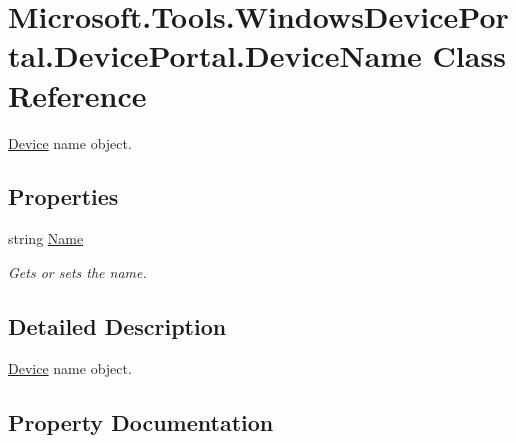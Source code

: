 \hypertarget{class_microsoft_1_1_tools_1_1_windows_device_portal_1_1_device_portal_1_1_device_name}{}\section{Microsoft.\+Tools.\+Windows\+Device\+Portal.\+Device\+Portal.\+Device\+Name Class Reference}
\label{class_microsoft_1_1_tools_1_1_windows_device_portal_1_1_device_portal_1_1_device_name}


\hyperlink{class_microsoft_1_1_tools_1_1_windows_device_portal_1_1_device_portal_1_1_device}{Device} name object.  


\subsection*{Properties}
\begin{DoxyCompactItemize}
\item 
string \hyperlink{class_microsoft_1_1_tools_1_1_windows_device_portal_1_1_device_portal_1_1_device_name_ae0374785073b3621d8d0f0d063aeec37}{Name}
\begin{DoxyCompactList}\small\item\em Gets or sets the name. \end{DoxyCompactList}\end{DoxyCompactItemize}


\subsection{Detailed Description}
\hyperlink{class_microsoft_1_1_tools_1_1_windows_device_portal_1_1_device_portal_1_1_device}{Device} name object. 



\subsection{Property Documentation}
